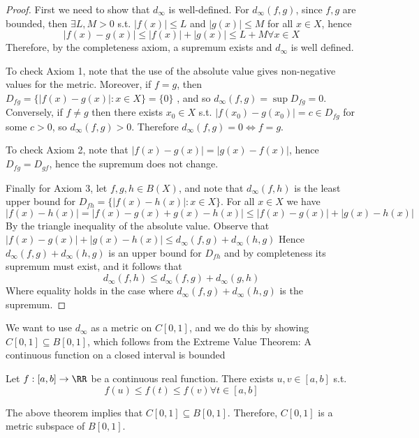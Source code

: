 \begin{proof}
  First we need to show that $d_{\infty}$ is well-defined. For
  $d_{\infty}(f,g)$, since $f,g$ are bounded, then $\exists L,M>0$ s.t.
  $|f(x)|\leq L$ and $|g(x)|\leq M$ for all $x\in X$, hence
  \[|f(x)-g(x)| \leq |f(x)|+|g(x)| \leq L+M \forall x\in X\]
  Therefore, by the completeness axiom, a supremum exists and $d_{\infty}$ is
  well defined.

  To check Axiom 1, note that the use of the absolute value gives non-negative
  values for the metric. Moreover, if $f=g$, then $D_{fg}=\{|f(x)-g(x)|:x\in
  X\}=\{0\}$ , and so $d_{\infty}(f,g)=\sup D_{fg} = 0$. Conversely, if $f\neq
  g$ then there exists $x_0\in X$ s.t. $|f(x_0)-g(x_0)|=c\in D_{fg}$ for some
  $c>0$, so $d_{\infty}(f,g)>0$. Therefore $d_{\infty}(f,g)=0 \iff f=g$.

  To check Axiom 2, note that $|f(x)-g(x)|=|g(x)-f(x)|$, hence
  $D_{fg}=D_{gf}$, hence the supremum does not change.

  Finally for Axiom 3, let $f,g,h\in B(X)$, and note that $d_{\infty}(f,h)$ is
  the least upper bound for $D_{fh}=\{|f(x)-h(x)| : x\in X\}$. For all $x\in X$
  we have 
  \[|f(x)-h(x)| = |f(x)-g(x)+g(x)-h(x)| \leq |f(x)-g(x)|+|g(x)-h(x)| \]
  By the triangle inequality of the absolute value. Observe that
  $|f(x)-g(x)|+|g(x)-h(x)| \leq d_{\infty}(f,g)+d_{\infty}(h,g)$
  Hence $d_{\infty}(f,g)+d_{\infty}(h,g)$ is an upper bound for $D_{fh}$ and by
  completeness its supremum must exist, and it follows that 
  \[d_{\infty}(f,h) \leq d_{\infty}(f,g)+ d_{\infty}(g,h) \]
  Where equality holds in the case where $d_{\infty}(f,g)+d_{\infty}(h,g)$ is
  the supremum.
\end{proof}
We want to use $d_{\infty}$ as a metric on $C[0,1]$, and we do this by showing
$C[0,1]\subseteq B[0,1]$, which follows from the Extreme Value Theorem: A
continuous function on a closed interval is bounded
\begin{theorem}
  Let $f:[a,b]\to\RR$ be a continuous real function. There exists $u,v\in [a,b]$
  s.t. 
  \[ f(u)\leq f(t)\leq f(v) \forall t\in [a,b]\]
  \label{thm:evt}
\end{theorem}
The above theorem implies that $C[0,1]\subseteq B[0,1]$. Therefore, $C[0,1]$ is
a metric subspace of $B[0,1]$.
